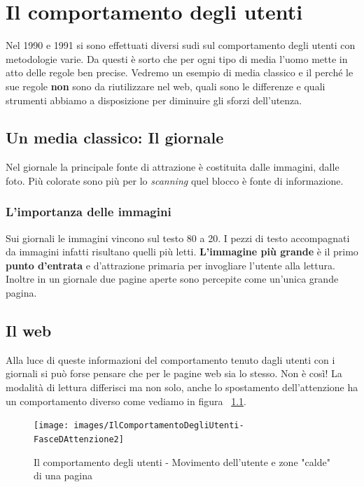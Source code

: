
\chapter{Il comportamento degli utenti}

	Nel 1990 e 1991 si sono effettuati diversi sudi sul comportamento degli utenti con metodologie varie. Da questi è sorto che per ogni tipo di media l'uomo mette in atto delle regole ben precise. 
	Vedremo un esempio di media classico e il perché le sue regole \textbf{non} sono da riutilizzare nel web, quali sono le differenze e quali strumenti abbiamo a disposizione per diminuire gli sforzi dell'utenza.
	
	\section{Un media classico: Il giornale}
	
		Nel giornale la principale fonte di attrazione è costituita dalle immagini, dalle foto. Più colorate sono più per lo \emph{scanning} quel blocco è fonte di informazione.
		
		\subsection{L'importanza delle immagini}
		
			Sui giornali le immagini vincono sul testo 80 a 20. I pezzi di testo accompagnati da immagini infatti risultano quelli più letti. \textbf{L'immagine più grande} è il primo \textbf{punto d'entrata} e d'attrazione primaria per invogliare l'utente alla lettura. Inoltre in un giornale due pagine aperte sono percepite come un'unica grande pagina.
		
	\section{Il web}
	
		Alla luce di queste informazioni del comportamento tenuto dagli utenti con i giornali si può forse pensare che per le pagine web sia lo stesso. Non è così! La modalità di lettura differisci ma non solo, anche lo spostamento dell'attenzione ha un comportamento diverso come vediamo in figura ~\ref{fig:FasceDAttenzione2}.
		
		\begin{figure} [h]
				\centering
				\texttt{[image: images/IlComportamentoDegliUtenti-FasceDAttenzione2]}
				\caption[Il comportamento degli utenti - Movimento utente e zone calde pagina]{Il comportamento degli utenti - Movimento dell'utente e zone "calde" di una pagina}
				\label{fig:FasceDAttenzione2}
		\end{figure}
		
